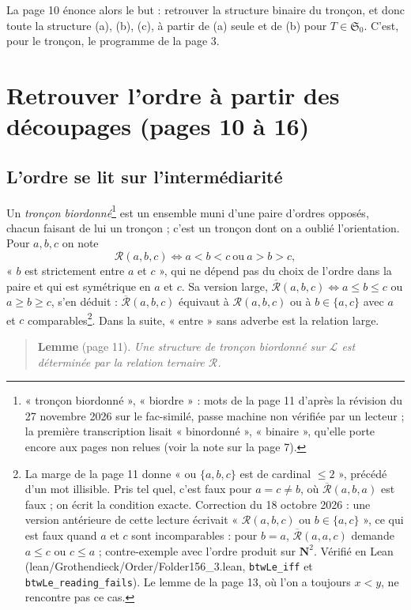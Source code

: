 \documentclass[11pt,a4paper]{article}
\begin{document}
La page 10 énonce alors le but : retrouver la structure binaire du tronçon, et
donc toute la structure (a), (b), (c), à partir de (a) seule et de (b) pour
$T \in \mathfrak{S}_{0}$. C'est, pour le tronçon, le programme de la page 3.

\section*{Retrouver l'ordre à partir des découpages (pages 10 à 16)}

\subsection*{L'ordre se lit sur l'intermédiarité}

Un \emph{tronçon biordonné}\footnote{« tronçon biordonné », « biordre » : mots
de la page 11 d'après la révision du 27 novembre 2026 sur le fac-similé, passe
machine non vérifiée par un lecteur ; la première transcription lisait
« binordonné », « binaire », qu'elle porte encore aux pages non relues (voir
la note sur la page 7).} est un ensemble muni d'une paire d'ordres
opposés, chacun faisant de lui un tronçon ; c'est un tronçon dont on a oublié
l'orientation. Pour $a, b, c$ on note
\[
\mathcal{R}(a,b,c) \iff a < b < c \ \text{ou}\ a > b > c,
\]
« $b$ est strictement entre $a$ et $c$ », qui ne dépend pas du choix de l'ordre
dans la paire et qui est symétrique en $a$ et $c$. Sa version large,
$\overline{\mathcal{R}}(a,b,c) \iff a \leq b \leq c$ ou $a \geq b \geq c$,
s'en déduit : $\overline{\mathcal{R}}(a,b,c)$ équivaut à $\mathcal{R}(a,b,c)$
ou à $b \in \{a,c\}$ avec $a$ et $c$ comparables\footnote{La marge de la page
11 donne « ou $\{a,b,c\}$ est de cardinal $\leq 2$ », précédé d'un mot
illisible. Pris tel quel, c'est faux pour $a = c \neq b$, où
$\overline{\mathcal{R}}(a,b,a)$ est faux ; on écrit la condition exacte.
Correction du 18 octobre 2026 : une version antérieure de cette lecture
écrivait « $\mathcal{R}(a,b,c)$ ou $b \in \{a,c\}$ », ce qui est faux quand $a$
et $c$ sont incomparables : pour $b = a$, $\overline{\mathcal{R}}(a,a,c)$
demande $a \leq c$ ou $c \leq a$ ; contre-exemple avec l'ordre produit sur
$\mathbf{N}^{2}$. Vérifié en Lean (lean/Grothendieck/Order/Folder156\_3.lean,
\texttt{btwLe\_iff} et \texttt{btwLe\_reading\_fails}). Le lemme de la page 13,
où l'on a toujours $x < y$, ne rencontre pas ce cas.}. Dans la suite, « entre » sans adverbe est la relation
large.

\begin{quote}
\textbf{Lemme} (page 11). \emph{Une structure de tronçon biordonné sur
$\mathcal{L}$ est déterminée par la relation ternaire $\mathcal{R}$.}
\end{quote}
\end{document}
